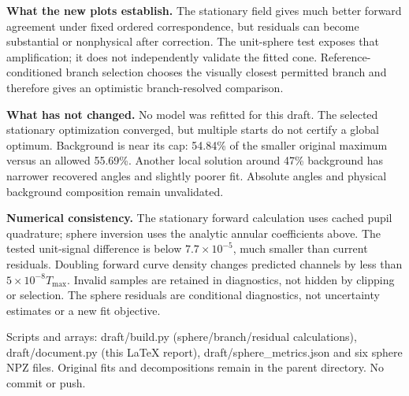 \documentclass[10pt,a4paper]{article}
\begin{document}
\textbf{What the new plots establish.} The stationary field gives much better forward agreement under fixed ordered correspondence, but residuals can become substantial or nonphysical after correction. The unit-sphere test exposes that amplification; it does not independently validate the fitted cone. Reference-conditioned branch selection chooses the visually closest permitted branch and therefore gives an optimistic branch-resolved comparison.

\textbf{What has not changed.} No model was refitted for this draft. The selected stationary optimization converged, but multiple starts do not certify a global optimum. Background is near its cap: 54.84\% of the smaller original maximum versus an allowed 55.69\%. Another local solution around 47\% background has narrower recovered angles and slightly poorer fit. Absolute angles and physical background composition remain unvalidated.

\textbf{Numerical consistency.} The stationary forward calculation uses cached pupil quadrature; sphere inversion uses the analytic annular coefficients above. The tested unit-signal difference is below $7.7\times10^{-5}$, much smaller than current residuals. Doubling forward curve density changes predicted channels by less than $5\times10^{-8}T_{\max}$. Invalid samples are retained in diagnostics, not hidden by clipping or selection. The sphere residuals are conditional diagnostics, not uncertainty estimates or a new fit objective.

Scripts and arrays: draft/build.py (sphere/branch/residual calculations), draft/document.py (this LaTeX report), draft/sphere\_metrics.json and six sphere NPZ files. Original fits and decompositions remain in the parent directory. No commit or push.
\end{document}
